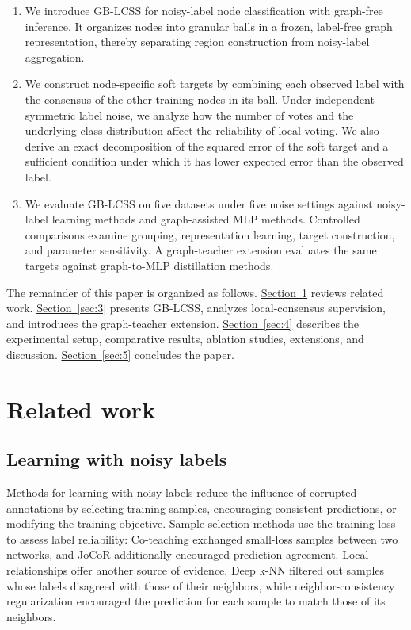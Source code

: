 \documentclass[10pt,letterpaper,nopreprintline]{elsarticle}
\theoremstyle{definition}
\theoremstyle{plain}
\begin{document}
\begin{enumerate}[label=(\arabic*)]
\item We introduce GB-LCSS for noisy-label node classification with graph-free inference. It organizes nodes into granular balls in a frozen, label-free graph representation, thereby separating region construction from noisy-label aggregation.
\item We construct node-specific soft targets by combining each observed label with the consensus of the other training nodes in its ball. Under independent symmetric label noise, we analyze how the number of votes and the underlying class distribution affect the reliability of local voting. We also derive an exact decomposition of the squared error of the soft target and a sufficient condition under which it has lower expected error than the observed label.
\item We evaluate GB-LCSS on five datasets under five noise settings against noisy-label learning methods and graph-assisted MLP methods. Controlled comparisons examine grouping, representation learning, target construction, and parameter sensitivity. A graph-teacher extension evaluates the same targets against graph-to-MLP distillation methods.
\end{enumerate}

The remainder of this paper is organized as follows. \hyperref[sec:2]{Section~\ref*{sec:2}} reviews related work. \hyperref[sec:3]{Section~\ref*{sec:3}} presents GB-LCSS, analyzes local-consensus supervision, and introduces the graph-teacher extension. \hyperref[sec:4]{Section~\ref*{sec:4}} describes the experimental setup, comparative results, ablation studies, extensions, and discussion. \hyperref[sec:5]{Section~\ref*{sec:5}} concludes the paper.

\section{Related work}\label{sec:2}

\subsection{Learning with noisy labels}\label{sec:2.1}

Methods for learning with noisy labels reduce the influence of corrupted annotations by selecting training samples, encouraging consistent predictions, or modifying the training objective. Sample-selection methods use the training loss to assess label reliability: Co-teaching \cite{ref17} exchanged small-loss samples between two networks, and JoCoR \cite{ref18} additionally encouraged prediction agreement. Local relationships offer another source of evidence. Deep k-NN \cite{ref11} filtered out samples whose labels disagreed with those of their neighbors, while neighbor-consistency regularization \cite{ref10} encouraged the prediction for each sample to match those of its neighbors.
\end{document}
